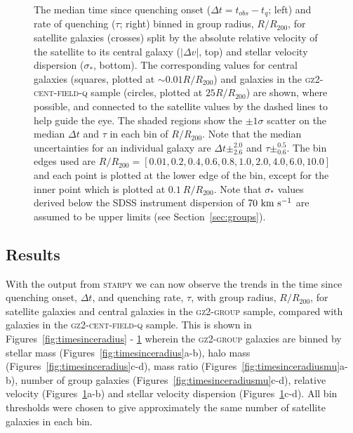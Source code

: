 \documentclass[useAMS,usenatbib]{mn2e}
\begin{document}
\begin{figure}
{\caption[Trend of $\Delta t$ and $\tau$ with group radius split by relative velocity and stellar velocity dispersion]{The median time since quenching onset ($\Delta t = t_{obs} - t_{q}$; left) and rate of quenching ($\tau$; right) binned in group radius, $R/R_{200}$, for satellite galaxies (crosses) split by the absolute relative velocity of the satellite to its central galaxy ($|\Delta v|$, top) and stellar velocity dispersion ($\sigma_*$, bottom). The corresponding values for central galaxies (squares, plotted at $\sim0.01 R/R_{200}$) and galaxies in the \textsc{gz2-cent-field-q} sample (circles, plotted at $25 R/R_{200}$) are shown, where possible, and connected to the satellite values by the dashed lines to help guide the eye. The shaded regions show the $\pm1\sigma$ scatter on the median $\Delta t$ and $\tau$ in each bin of $R/R_{200}$. Note that the median uncertainties for an individual galaxy are $\Delta t\pm_{2.6}^{2.0}$ and $\tau\pm_{0.6}^{0.5}$. The bin edges used are $R/R_{200} =  [0.01 ,   0.2,   0.4,   0.6,   0.8,   1.0 ,   2.0 ,   4.0 ,   6.0 ,  10.0]$ and each point is plotted at the lower edge of the bin, except for the inner point which is plotted at $0.1~R/R_{200}$. Note that $\sigma_*$ values derived below the SDSS instrument dispersion of $70~\rm{km}~\rm{s}^{-1}$ are assumed to be upper limits (see Section~\ref{sec:groups}).}
\label{fig:timesinceradiusvel}}
\end{figure}


\subsection{Results}\label{sec:resultssfhs}

With the output from \textsc{starpy} we can now observe the trends in the time since quenching onset, $\Delta t$, and quenching rate, $\tau$, with group radius, $R/R_{200}$, for satellite galaxies and central galaxies in the \textsc{gz2-group} sample, compared with galaxies in the \textsc{gz2-cent-field-q} sample. This is shown in Figures~\ref{fig:timesinceradius} - \ref{fig:timesinceradiusvel} wherein the \textsc{gz2-group} galaxies are binned by stellar mass (Figures~\ref{fig:timesinceradius}a-b), halo mass (Figures~\ref{fig:timesinceradius}c-d), mass ratio (Figures~\ref{fig:timesinceradiusmu}a-b), number of group galaxies (Figures~\ref{fig:timesinceradiusmu}c-d), relative velocity (Figures~\ref{fig:timesinceradiusvel}a-b) and stellar velocity dispersion (Figures~\ref{fig:timesinceradiusvel}c-d). All bin thresholds were chosen to give approximately the same number of satellite galaxies in each bin. 
\end{document}
